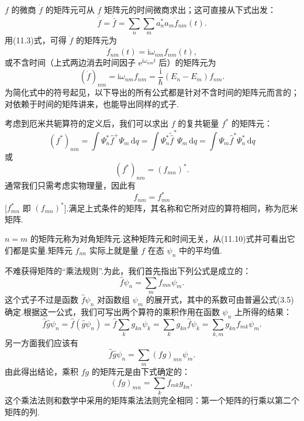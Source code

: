 $f$ 的微商 $\dot{f}$ 的矩阵元可从 $f$ 矩阵元的时间微商求出；这可直接从下式出发：
\begin{equation}
  \overline{\dot{f}}=\dot{\bar{f}}
  =\sum_n\sum_m a_n^{*}a_m\dot{f}_{nm}(t).
\end{equation}
用(11.3)式，可得 $\dot{f}$ 的矩阵元为
\begin{equation}
  \dot{f}_{nm}(t)=\mathrm{i}\omega_{nm}f_{nm}(t),
\end{equation}
或不含时间（上式两边消去时间因子 $\mathrm{e}^{\mathrm{i}\omega_{nm}t}$ 后）的矩阵元为
\begin{equation}
  (\dot{f})_{nm}=\mathrm{i}\omega_{nm}f_{nm}
  =\frac{\mathrm{i}}{\hbar}(E_n-E_m)f_{nm}.
\end{equation}
为简化式中的符号起见，以下导出的所有公式都是针对不含时间的矩阵元而言的；对依赖于时间的矩阵讲来，也能导出同样的式子.

考虑到厄米共轭算符的定义后，我们可以求出 $f$ 的复共轭量 $f^{*}$ 的矩阵元：
\begin{equation*}
  (f^{*})_{nm}=\int\varPsi_n^{*}\hat{f}^{+}\varPsi_m\,\mathrm{d}q
  =\int\varPsi_n^{*}\tilde{\hat{f}}^{*}\varPsi_m\,\mathrm{d}q
  =\int\varPsi_m\hat{f}^{*}\varPsi_n^{*}\,\mathrm{d}q
\end{equation*}
或
\begin{equation}
  (f^{*})_{nm}=(f_{mn})^{*}.
\end{equation}
通常我们只需考虑实物理量，因此有
\begin{equation}
  f_{nm}=f_{mn}^{*}
\end{equation}
[$f_{mn}^{*}$ 即 $(f_{mn})^{*}$].满足上式条件的矩阵，其名称和它所对应的算符相同，称为厄米矩阵.

$n=m$ 的矩阵元称为对角矩阵元.这种矩阵元和时间无关，从(11.10)式并可看出它们都是实量.矩阵元 $f_{nn}$ 实际上就是量 $f$ 在态 $\psi_n$ 中的平均值.

不难获得矩阵的“乘法规则”.为此，我们首先指出下列公式是成立的：
\begin{equation}
  \hat{f}\psi_n=\sum_mf_{mn}\psi_m.
\end{equation}
这个式子不过是函数 $\hat{f}\psi_n$ 对函数组 $\psi_m$ 的展开式，其中的系数可由普遍公式(3.5)确定.根据这一公式，我们可写出两个算符的乘积作用在函数 $\psi_n$ 上所得的结果：
\begin{equation*}
  \hat{f}\hat{g}\psi_n=\hat{f}(\hat{g}\psi_n)
  =\hat{f}\sum_kg_{kn}\psi_k
  =\sum_kg_{kn}\hat{f}\psi_k
  =\sum_{k,m}g_{kn}f_{mk}\psi_m.
\end{equation*}
另一方面我们应该有
\begin{equation*}
  \hat{f}\hat{g}\psi_n=\sum_m(fg)_{mn}\psi_m.
\end{equation*}
由此得出结论，乘积 $fg$ 的矩阵元是由下式确定的：
\begin{equation}
  (fg)_{mn}=\sum_kf_{mk}g_{kn},
\end{equation}
这个乘法法则和数学中采用的矩阵乘法法则完全相同：第一个矩阵的行乘以第二个矩阵的列.

